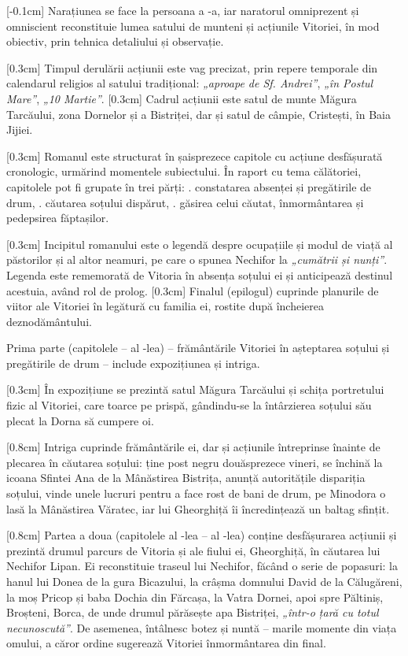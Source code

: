 [-0.1cm]
Narațiunea se face la persoana a -a, iar naratorul omniprezent și omniscient reconstituie lumea satului de munteni și acțiunile Vitoriei, în mod obiectiv, prin tehnica detaliului și observație.

[0.3cm]
Timpul derulării acțiunii este vag precizat, prin repere temporale din calendarul religios al satului tradițional: \textit{„aproape de Sf. Andrei”}, \textit{„în Postul Mare”}, \textit{„10 Martie”}.
[0.3cm]
Cadrul acțiunii este satul de munte Măgura Tarcăului, zona Dornelor și a Bistriței, dar și satul de câmpie, Cristești, în Baia Jijiei.

[0.3cm]
Romanul este structurat în șaisprezece capitole cu acțiune desfășurată cronologic, urmărind momentele subiectului. În raport cu tema călătoriei, capitolele pot fi grupate în trei părți: . constatarea absenței și pregătirile de drum, . căutarea soțului dispărut, . găsirea celui căutat, înmormântarea și pedepsirea făptașilor.

[0.3cm]
Incipitul romanului este o legendă despre ocupațiile și modul de viață al păstorilor și al altor neamuri, pe care o spunea Nechifor la \textit{„cumătrii și nunți”}. Legenda este rememorată de Vitoria în absența soțului ei și anticipează destinul acestuia, având rol de prolog.
[0.3cm]
Finalul (epilogul) cuprinde planurile de viitor ale Vitoriei în legătură cu familia ei, rostite după încheierea deznodământului.

Prima parte (capitolele  -- al -lea) -- frământările Vitoriei în așteptarea soțului și pregătirile de drum -- include expozițiunea și intriga.

[0.3cm]
În expozițiune se prezintă satul Măgura Tarcăului și schița portretului fizic al Vitoriei, care toarce pe prispă, gândindu-se la întârzierea soțului său plecat la Dorna să cumpere oi.

[0.8cm]
Intriga cuprinde frământările ei, dar și acțiunile întreprinse înainte de plecarea în căutarea soțului: ține post negru douăsprezece vineri, se închină la icoana Sfintei Ana de la Mânăstirea Bistrița, anunță autoritățile dispariția soțului, vinde unele lucruri pentru a face rost de bani de drum, pe Minodora o lasă la Mânăstirea Văratec, iar lui Gheorghiță îi încredințează un baltag sfințit.

[0.8cm]
Partea a doua (capitolele al -lea -- al -lea) conține desfășurarea acțiunii și prezintă drumul parcurs de Vitoria și ale fiului ei, Gheorghiță, în căutarea lui Nechifor Lipan. Ei reconstituie traseul lui Nechifor, făcând o serie de popasuri: la hanul lui Donea de la gura Bicazului, la crâșma domnului David de la Călugăreni, la moș Pricop și baba Dochia din Fărcașa, la Vatra Dornei, apoi spre Păltiniș, Broșteni, Borca, de unde drumul părăsește apa Bistriței, \textit{„într-o țară cu totul necunoscută”}. De asemenea, întâlnesc botez și nuntă -- marile momente din viața omului, a căror ordine sugerează Vitoriei înmormântarea din final.

